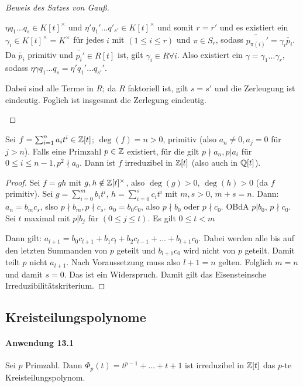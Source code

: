 \documentclass[12pt,a4paper]{scrartcl}
\begin{document}
\begin{proof}[Beweis des Satzes von Gauß]
\begin{itemize}
		$\eta q_1\dots q_s\in K[t]^{\times}$ und $\eta'q_1 '\dots q'_{s'}\in K[t]^{\times}$ und somit $r = r'$ und es existiert ein $\gamma_i\in K[t]^{\times} =K^{\times}$ für jedes $i$ mit $(1\leq i \leq r)$ und $\pi\in S_r$, sodass $\tilde{p_{\pi(i)}'} = \gamma_i\tilde{p_i}$. Da $\tilde{p_i}$ primitiv und $\tilde{p_i'}\in R[t]$ ist, gilt $\gamma_i\in R\forall i$. Also existiert ein $\gamma = \gamma_1\dots \gamma_r$, sodass $\eta\gamma{q_1}\dots {q_s} = \eta'{q_1'}\dots {q_{s'}'}$.
		
		Dabei sind alle Terme in $R$; da $R$ faktoriell ist, gilt $s = s'$ und die Zerleugung ist \glqq eindeutig\grqq.  Foglich ist insgesmat die Zerlegung \glqq eindeutig\grqq.
	\end{itemize}
\end{proof}

\begin{satz}
	Sei $f = \sum_{i = 1}^n a_it^i\in\mathbb Z[t]$; $\deg (f) = n>0$, primitiv (also $a_n\neq 0, a_j = 0$ für $j>n$). Falls eine Primzahl $p\in\mathbb Z$ existiert, für die gilt $p\nmid a_n, p|a_i$ für $0\leq i\leq n-1, p^2\nmid a_0$. Dann ist $f$ irreduzibel in $\mathbb Z[t]$ (also auch in $\mathbb Q[t]$).
\end{satz}

\begin{proof}
	Sei $f = gh$ mit $g, h\notin \mathbb Z[t]^{\times}$, also $\deg(g)>0$, $\deg(h)>0$ (da $f$ primitiv). Sei $g = \sum_{i = 0}^mb_it^i$, $h = \sum_{i = 0}^sc_it^i$ mit $m,s>0$, $m+s = n$. Dann: $a_n = b_mc_s$, slso $p\nmid b_m, p\nmid c_s$, $a_0 = b_0c_0$, also $p\nmid b_0$ oder $p\nmid c_0$. OBdA $p|b_0$, $p\nmid c_0$. Sei $t$ maximal mit $p|b_j$ für $(0\leq j\leq t)$. Es gilt $0\leq t < m$
	
	Dann gilt: $a_{l+1} = b_0c_{l+1} +b_1c_l +b_2c_{l-1}+\dots +b_{l+1}c_0$. Dabei werden alle bis auf den letzten Summanden von $p$ geteilt und $b_{l+1}c_0$ wird nicht von $p$ geteilt. Damit teilt $p$ nicht $a_{l+1}$. Nach Voraussetzung muss also $l+1 = n$ gelten. Folglich $m = n$ und damit $s = 0$. Das ist ein Widerspruch. Damit gilt das Eisensteinsche Irreduzibilitätskriterium.
\end{proof}

\subsection{Kreisteilungspolynome}
\paragraph{Anwendung 13.1} %
Sei $p$ Primzahl. Dann $\Phi_p(t) = t^{p-1}+\dots +t+1$ ist irreduzibel in $\mathbb Z[t]$ das $p$-te Kreisteilungspolynom.
\end{document}
